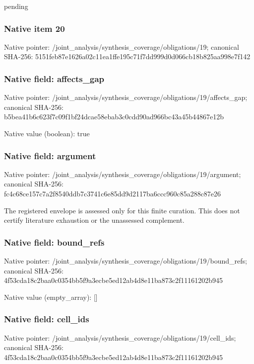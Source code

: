 \documentclass[10pt,a4paper]{article}
\begin{document}
\begingroup\raggedright\sloppy pending\par\endgroup

\subsubsection{Native item 20}
Native pointer: /joint\_\allowbreak{}analysis/synthesis\_\allowbreak{}coverage/obligations/19; canonical SHA-256: 5151feb87e1626a02c11ea1ffe195c71f7dd999d0d066cb18b825aa998e7f142

\subsubsection{Native field: affects\_\allowbreak{}gap}
Native pointer: /joint\_\allowbreak{}analysis/synthesis\_\allowbreak{}coverage/obligations/19/affects\_\allowbreak{}gap; canonical SHA-256: b5bea41b6c623f7c09f1bf24dcae58ebab3c0cdd90ad966bc43a45b44867e12b

Native value (boolean): true

\subsubsection{Native field: argument}
Native pointer: /joint\_\allowbreak{}analysis/synthesis\_\allowbreak{}coverage/obligations/19/argument; canonical SHA-256: fc4c68ce157c7a2f8540ddb7c3741c6e85dd9d2117ba6ccc960c85a288c87e26

\begingroup\raggedright\sloppy The registered envelope is assessed only for this finite curation. This does not certify literature exhaustion or the unassessed complement.\par\endgroup

\subsubsection{Native field: bound\_\allowbreak{}refs}
Native pointer: /joint\_\allowbreak{}analysis/synthesis\_\allowbreak{}coverage/obligations/19/bound\_\allowbreak{}refs; canonical SHA-256: 4f53cda18c2baa0c0354bb5f9a3ecbe5ed12ab4d8e11ba873c2f11161202b945

Native value (empty\_\allowbreak{}array): []

\subsubsection{Native field: cell\_\allowbreak{}ids}
Native pointer: /joint\_\allowbreak{}analysis/synthesis\_\allowbreak{}coverage/obligations/19/cell\_\allowbreak{}ids; canonical SHA-256: 4f53cda18c2baa0c0354bb5f9a3ecbe5ed12ab4d8e11ba873c2f11161202b945
\end{document}
